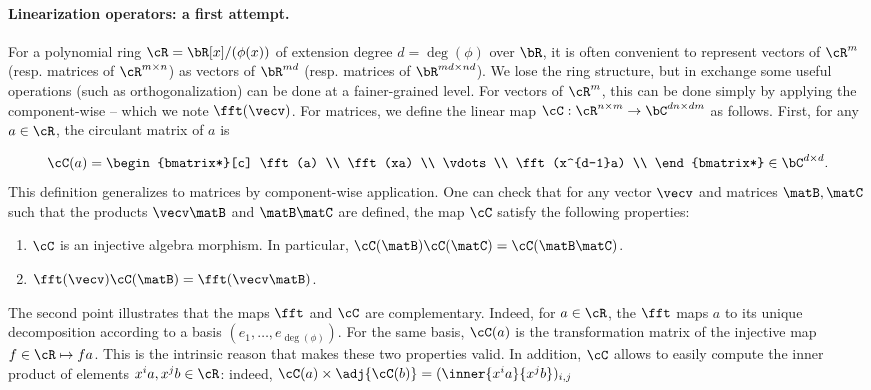 \paragraph{Linearization operators: a first attempt.} For a polynomial ring $\cR = \bR[x]/(\phi(x))$ of extension degree $d=\deg(\phi)$ over $\bR$, it is often convenient to represent vectors of $\cR^m$ (resp. matrices of $\cR^{m\times n}$) as vectors of $\bR^{md}$ (resp. matrices of $\bR^{md\times nd}$). We lose the ring structure, but in exchange some useful operations (such as orthogonalization) can be done at a fainer-grained level. For vectors of $\cR^m$, this can be done simply by applying the \fft{} component-wise -- which we note $\fft(\vecv)$. For matrices, we define the linear map $\cC : \cR^{n\times m} \rightarrow \bC^{dn \times dm}$ as follows. First, for any $a\in \cR$, the circulant matrix of $a$ is
 
 \begin{equation}
\cC(a) = \begin{bmatrix*}[c]   \fft(a) \\
\fft(xa) \\
 \vdots \\
\fft(x^{d-1}a) \\ \end{bmatrix*} \in \bC^{d\times d}.
\end{equation}
This definition generalizes to matrices by component-wise application. One can check that for any vector $\vecv$ and matrices $\matB,\matC$ such that the products $\vecv \matB$ and $\matB \matC$ are defined, the map $\cC$ satisfy the following properties: 
\begin{enumerate}
 \item 
 $\cC$ is an injective algebra morphism. In particular, $\cC(\matB) \cC(\matC) = \cC(\matB \matC)$.
 \item\label{item:circ}
 $\fft(\vecv)\cC(\matB) = \fft(\vecv \matB)$.
\end{enumerate}

The second point illustrates that the maps $\fft$ and $\cC$ are complementary. Indeed, for $a\in \cR$, the $\fft$ maps $a$ to its unique decomposition according to a basis $(e_1,\dots,e_{\deg(\phi)})$. For the same basis, $\cC(a)$ is the transformation matrix of the injective map $f \in \cR \mapsto f a$. This is the intrinsic reason that makes these two properties valid. In addition, $\cC$ allows to easily compute the inner product of elements $x^i a, x^j b\in\cR$: indeed, $\cC(a) \times \adj{\cC(b)} = (\inner{x^i a}{x^j b})_{i,j}$

